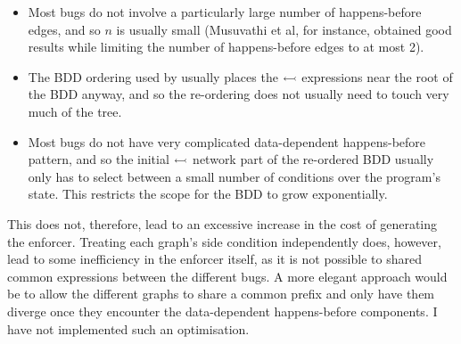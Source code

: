 \begin{itemize}
\item
  Most bugs do not involve a particularly large number of
  happens-before edges, and so $n$ is usually small (Musuvathi et
  al\cite{Musuvathi2007}, for instance, obtained good results while
  limiting the number of happens-before edges to at most 2).
\item
  The BDD ordering used by {\technique} usually places the
  $\leftarrowtail$ expressions near the root of the BDD anyway,
  and so the re-ordering does not usually need to touch very much of
  the tree.
\item
  Most bugs do not have very complicated data-dependent happens-before
  pattern, and so the initial $\leftarrowtail$ network part of the
  re-ordered BDD usually only has to select between a small number of
  conditions over the program's state.  This restricts the scope for
  the BDD to grow exponentially.
\end{itemize}

This does not, therefore, lead to an excessive increase in the cost of
generating the enforcer.  Treating each graph's side condition
independently does, however, lead to some inefficiency in the enforcer
itself, as it is not possible to shared common expressions between the
different bugs.  A more elegant approach would be to allow the
different graphs to share a common prefix and only have them diverge
once they encounter the data-dependent happens-before components.  I
have not implemented such an optimisation.

